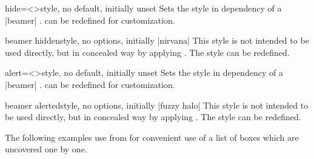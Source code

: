 \begin{docTcbKey}[][doc new={2019-03-01}]{hide}{=\textless{}\textgreater}{style, no default, initially unset}
Sets the  style in dependency of
a |beamer| .
 can be redefined for customization.
\end{docTcbKey}


\begin{docTcbKey}[][doc new={2019-03-01}]{beamer hidden}{}{style, no options, initially |nirvana|}
This style is not intended to be used directly, but in concealed way by applying
. The style can be redefined.
\begin{dispListing}
\end{dispListing}
\end{docTcbKey}


\begin{docTcbKey}[][doc new={2019-03-01}]{alert}{=\textless{}\textgreater}{style, no default, initially unset}
Sets the  style in dependency of
a |beamer| .
 can be redefined for customization.
\end{docTcbKey}


\begin{docTcbKey}[][doc new={2019-03-01}]{beamer alerted}{}{style, no options, initially |fuzzy halo|}
This style is not intended to be used directly, but in concealed way by applying
. The style can be redefined.
\begin{dispListing}
\end{dispListing}
\end{docTcbKey}


\bigskip

The following examples use  from  for
convenient use of a list of boxes which are uncovered one by one.


